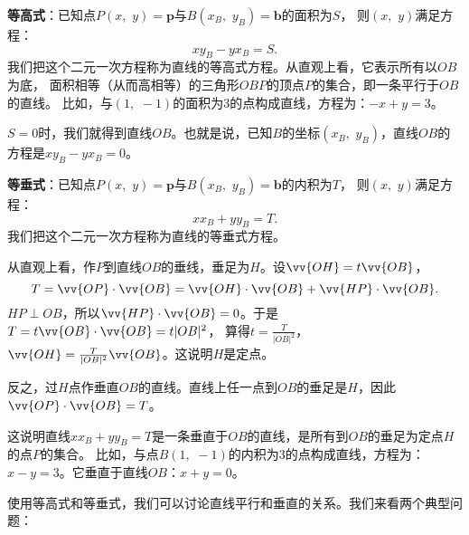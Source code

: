 \documentclass[12pt,UTF8]{ctexbook}
\theoremstyle{definition}
\theoremstyle{plain}
\begin{document}
\textbf{等高式}：已知点$P(x,\,\, y) = \mathbf{p}$与$B(x_B,\,\, y_B) = \mathbf{b}$的面积为$S$，
则$(x,\,\,y)$满足方程：
$$x y_B - y x_B = S.$$
我们把这个二元一次方程称为直线的等高式方程。从直观上看，它表示所有以$OB$为底，
面积相等（从而高相等）的三角形$OBP$的顶点$P$的集合，即一条平行于$OB$的直线。
比如，与$(1,\,\,-1)$的面积为$3$的点构成直线，方程为：$-x + y = 3$。

$S=0$时，我们就得到直线$OB$。也就是说，已知$B$的坐标$(x_B,\,\, y_B)$，直线$OB$的方程是$x y_B - y x_B = 0$。

\textbf{等垂式}：已知点$P(x, \,\,y) = \mathbf{p}$与$B(x_B, \,\,y_B) = \mathbf{b}$的内积为$T$，
则$(x,\,\,y)$满足方程：
$$x x_B + y y_B = T.$$
我们把这个二元一次方程称为直线的等垂式方程。

从直观上看，作$P$到直线$OB$的垂线，垂足为$H$。设$\vv{OH} = t \vv{OB}$，
$$ T = \vv{OP} \cdot \vv{OB} = \vv{OH} \cdot \vv{OB} + \vv{HP} \cdot \vv{OB}.$$
$ HP \perp OB$，所以$\vv{HP} \cdot \vv{OB} = 0$。于是$T = t \vv{OB} \cdot \vv{OB} = t|OB|^2$，
算得$t = \frac{T}{|OB|^2}$，$\vv{OH} = \frac{T}{|OB|^2} \vv{OB}$。这说明$H$是定点。

反之，过$H$点作垂直$OB$的直线。直线上任一点到$OB$的垂足是$H$，因此$\vv{OP} \cdot \vv{OB} = T$。

这说明直线$x x_B + y y_B = T$是一条垂直于$OB$的直线，是所有到$OB$的垂足为定点$H$的点$P$的集合。
比如，与点$B(1,\,\,-1)$的内积为$3$的点构成直线，方程为：$x - y = 3$。它垂直于直线$OB$：$x + y = 0$。

使用等高式和等垂式，我们可以讨论直线平行和垂直的关系。我们来看两个典型问题：
\end{document}

